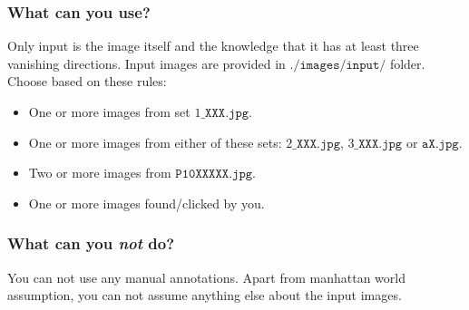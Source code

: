 \documentclass[11pt]{article}
\begin{document}
\subsubsection{What can you use?}
\label{inp2}
Only input is the image itself and the knowledge that it has at least three vanishing directions. Input images are provided in $\texttt{./images/input/}$ folder. Choose based on these rules:
\begin{itemize}
\item One or more images from set $1\_\texttt{XXX.jpg}$.
\item One or more images from either of these sets: $2\_\texttt{XXX.jpg}$, $3\_\texttt{XXX.jpg}$ or $\texttt{aX.jpg}$.
\item Two or more images from $\texttt{P10XXXXX.jpg}$.
\item One or more images found/clicked by you.
\end{itemize}

\subsubsection{What can you {\it not} do?}
You can not use any manual annotations. Apart from manhattan world assumption, you can not assume anything else about the input images.
\end{document}
